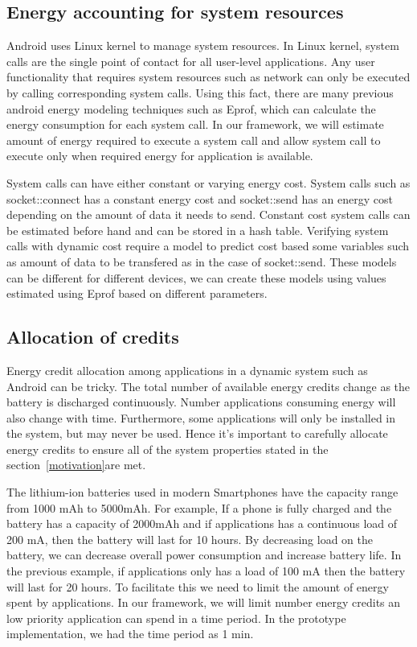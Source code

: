 \subsection{Energy accounting for system resources }

Android uses Linux kernel to manage system resources. In Linux kernel, system calls are the single point of contact for all user-level applications. Any user functionality that requires system resources such as network can only be executed by calling corresponding system calls. Using this fact, there are many previous android energy modeling techniques such as Eprof, which can calculate the energy consumption for each system call. In our framework, we will estimate amount of energy required to execute a system call and allow system call to execute only when required energy for application is available.

System calls can have either constant or varying energy cost. System calls such as socket::connect has a constant energy cost and socket::send has an energy cost depending on the amount of data it needs to send. Constant cost system calls can be estimated before hand and can be stored in a hash table. Verifying system calls with dynamic cost require a model to predict cost based some variables such as amount of data to be transfered as in the case of socket::send. These models can be different for different devices, we can create these models using values estimated using Eprof based on different parameters.

\subsection{ Allocation of credits }

Energy credit allocation among applications in a dynamic system such as Android can be tricky. The total number of available energy credits change as the battery is discharged continuously. Number applications consuming energy will also change with time. Furthermore, some applications will only be installed in the system, but may never be used. Hence it's important to carefully allocate energy credits to ensure all of the system properties stated in the section~\ref{motivation}are met.

The lithium-ion batteries used in modern Smartphones have the capacity range from 1000 mAh to 5000mAh. For example, If a phone is fully charged and the battery has a capacity of 2000mAh and if applications has a continuous load of 200 mA, then the battery will last for 10 hours. By decreasing load on the battery, we can decrease overall power consumption and increase battery life. In the previous example, if applications only has a load of 100 mA then the battery will last for 20 hours. To facilitate this we need to limit the amount of energy spent by applications. In our framework, we will limit number energy credits an low priority application can spend in a time period. In the prototype implementation, we had the time period as 1 min.

